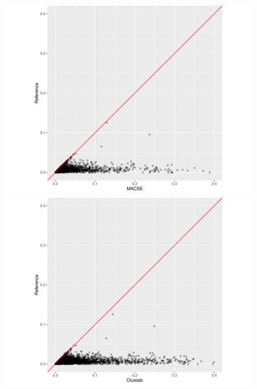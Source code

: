 \documentclass[aspectratio=169,font=14pt]{beamer}
\begin{document}
\begin{frame}[noframenumbering] %
\begin{columns}
        \includegraphics[width = \textwidth, trim={2.5cm 0 3cm 0}, clip]{defense/suppl/MACSE_ref_distance.png}
        \includegraphics[width = \textwidth, trim={2.5cm 0 3cm 0}, clip]{defense/suppl/Clustalo_ref_distance.png}
\end{columns}
\end{frame} %
\end{document}
